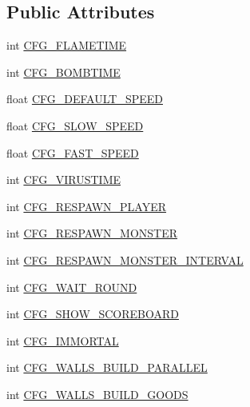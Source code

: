 \subsection*{Public Attributes}
\begin{DoxyCompactItemize}
\item 
int \hyperlink{class_config_a2660688203b9170918c7e2e8e5b54ed4}{C\-F\-G\-\_\-\-F\-L\-A\-M\-E\-T\-I\-M\-E}
\item 
int \hyperlink{class_config_a0574d1159f4788df4ba510d1d3e83498}{C\-F\-G\-\_\-\-B\-O\-M\-B\-T\-I\-M\-E}
\item 
float \hyperlink{class_config_a8f2b0ec592b0bda65e2133e21fe46979}{C\-F\-G\-\_\-\-D\-E\-F\-A\-U\-L\-T\-\_\-\-S\-P\-E\-E\-D}
\item 
float \hyperlink{class_config_a1e059aee7b0dccef0baeae3ac1e51ff8}{C\-F\-G\-\_\-\-S\-L\-O\-W\-\_\-\-S\-P\-E\-E\-D}
\item 
float \hyperlink{class_config_a2e8f4b387f08e51b6bfc9c27905beb60}{C\-F\-G\-\_\-\-F\-A\-S\-T\-\_\-\-S\-P\-E\-E\-D}
\item 
int \hyperlink{class_config_a27f5415363ce485450a5e565fc07eedf}{C\-F\-G\-\_\-\-V\-I\-R\-U\-S\-T\-I\-M\-E}
\item 
int \hyperlink{class_config_a4dca8b903aa44d2eeac1360b3bd8abe3}{C\-F\-G\-\_\-\-R\-E\-S\-P\-A\-W\-N\-\_\-\-P\-L\-A\-Y\-E\-R}
\item 
int \hyperlink{class_config_a68f25bf53407aa4d78dbf20810084c21}{C\-F\-G\-\_\-\-R\-E\-S\-P\-A\-W\-N\-\_\-\-M\-O\-N\-S\-T\-E\-R}
\item 
int \hyperlink{class_config_ad7096d8320756b47101410a630072959}{C\-F\-G\-\_\-\-R\-E\-S\-P\-A\-W\-N\-\_\-\-M\-O\-N\-S\-T\-E\-R\-\_\-\-I\-N\-T\-E\-R\-V\-A\-L}
\item 
int \hyperlink{class_config_aa9c1a6477d3af67f0d9af85abe1ab399}{C\-F\-G\-\_\-\-W\-A\-I\-T\-\_\-\-R\-O\-U\-N\-D}
\item 
int \hyperlink{class_config_a4d8faf4496d7fad5ce922354581e7c2b}{C\-F\-G\-\_\-\-S\-H\-O\-W\-\_\-\-S\-C\-O\-R\-E\-B\-O\-A\-R\-D}
\item 
int \hyperlink{class_config_aba9d64248625f53dee1028d3e4bf687d}{C\-F\-G\-\_\-\-I\-M\-M\-O\-R\-T\-A\-L}
\item 
int \hyperlink{class_config_a254ff81fc5ea5548eebb2183b2735b03}{C\-F\-G\-\_\-\-W\-A\-L\-L\-S\-\_\-\-B\-U\-I\-L\-D\-\_\-\-P\-A\-R\-A\-L\-L\-E\-L}
\item 
int \hyperlink{class_config_a2e5d6126f1663b33d5e3aac02820ce50}{C\-F\-G\-\_\-\-W\-A\-L\-L\-S\-\_\-\-B\-U\-I\-L\-D\-\_\-\-G\-O\-O\-D\-S}

\end{DoxyCompactItemize}
